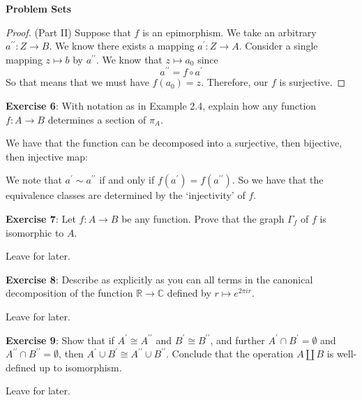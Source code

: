 \documentclass{report}
\begin{document}
\begin{exercises}{\textbf{Problem Sets}}
\begin{proof}
            (Part II) Suppose that $f$ is an epimorphism. We take an arbitrary $a^{\prime\prime} : Z \rightarrow B$. We know there exists a mapping $a^{\prime} : Z \rightarrow A$. Consider a single mapping $z \mapsto b$ by $a^{\prime\prime}$. We know that $z \mapsto a_{0}$ since
                \begin{equation*}
                    a^{\prime\prime} = f \circ a^{\prime}
                \end{equation*}
            So that means that we must have $f(a_{0}) = z$. Therefore, our $f$ is surjective.
        \end{proof}

    \textbf{Exercise 6}: With notation as in Example 2.4, explain how any function $f: A \rightarrow B$ determines a section of $\pi_{A}$.
        \begin{answer}
            We have that the function can be decomposed into a surjective, then bijective, then injective map:
                \begin{center}
                \end{center}
            We note that $a^{\prime} \sim a^{\prime\prime}$ if and only if $f(a^{\prime}) = f(a^{\prime\prime})$. So we have that the equivalence classes are determined by the `injectivity' of $f$.
        \end{answer}

    \textbf{Exercise 7}: Let $f: A \rightarrow B$ be any function. Prove that the graph $\Gamma_{f}$ of $f$ is isomorphic to $A$.
        \begin{answer}
            Leave for later.
        \end{answer}

    \textbf{Exercise 8}: Describe as explicitly as you can all terms in the canonical decomposition of the function $\mathbb{R} \rightarrow \mathbb{C}$ defined by $r \mapsto e^{2\pi ir}$. 
        \begin{answer}
            Leave for later.
        \end{answer}

    \textbf{Exercise 9}: Show that if $A^{\prime} \cong A^{\prime\prime}$ and $B^{\prime} \cong B^{\prime\prime}$, and further $A^{\prime} \cap B^{\prime} = \emptyset$ and $A^{\prime\prime} \cap B^{\prime\prime} = \emptyset$, then $A^{\prime}\cup B^{\prime} \cong A^{\prime\prime} \cup B^{\prime\prime}$. Conclude that the operation $A \coprod B$ is well-defined up to isomorphism.
        \begin{answer}
            Leave for later.
        \end{answer}


\end{exercises}
\end{document}
